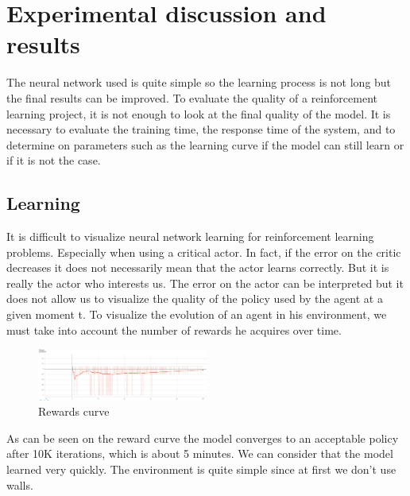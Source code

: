 \section*{Experimental discussion and results}
The neural network used is quite simple so the learning process is not long but the final results can be improved.
To evaluate the quality of a reinforcement learning project, it is not enough to look at the final quality of the model.
It is necessary to evaluate the training time, the response time of the system, and to determine on parameters such as the learning curve if the model can still learn or if it is not the case.

\subsection*{Learning}

It is difficult to visualize neural network learning for reinforcement learning problems.
Especially when using a critical actor.
In fact, if the error on the critic decreases it does not necessarily mean that the actor learns correctly. But it is really the actor who interests us. The error on the actor can be interpreted but it does not allow us to visualize the quality of the policy used by the agent at a given moment t.
To visualize the evolution of an agent in his environment, we must take into account the number of rewards he acquires over time.

\begin{figure}[H]
    \centering
    \includegraphics[width=0.5\textwidth]{imgs/reward.png}
    \caption{\label{fig:method} Rewards curve}
\end{figure}

As can be seen on the reward curve the model converges to an acceptable policy after 10K iterations, which is about 5 minutes.
We can consider that the model learned very quickly. 
The environment is quite simple since at first we don't use walls.

